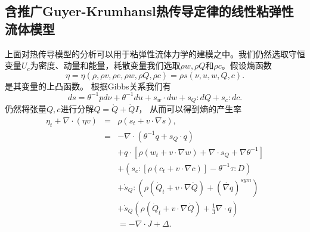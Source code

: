 \subsection{含推广Guyer-Krumhansl热传导定律的线性粘弹性流体模型}
上面对热传导模型的分析可以用于粘弹性流体力学的建模之中。我们仍然选取守恒变量$U_c$为密度、动量和能量，耗散变量我们选取$\rho w, \rho Q$和$ \rho c$。假设熵函数
\begin{equation*}
	\eta = \eta (\rho,\rho v,\rho e,\rho w,\rho Q,\rho c) = \rho s(\nu,u,w,Q,c).
\end{equation*}
是其变量的上凸函数。
根据Gibbs关系我们有
\begin{equation*}
			ds = \theta^{-1} pd\nu + \theta^{-1} du + s_w \cdot dw + s_Q:dQ+ s_c : dc.
\end{equation*}
仍然将张量$Q,c$进行分解$Q = \mathring{Q} +\dot{Q}I$，
从而可以得到熵的产生率
\begin{eqnarray*}
		\eta_t + \nabla \cdot (\eta v) &=& \rho (s_t + v \cdot \nabla s), \\
		&=& -\nabla \cdot (\theta^{-1} q + s_Q \cdot {q} )  \\
		&&+ q \cdot [\rho (w_t + v \cdot \nabla w) + \nabla \cdot s_Q + \nabla \theta^{-1}] \\
		&&+ (s_c:[\rho (c_t + v \cdot \nabla c)] - \theta^{-1} \tau : D) \\
		&&+\mathring{s}_Q:(\rho (\mathring{{Q}}_t + v \cdot \nabla \mathring{Q})+(\mathring{\nabla {q}})^{sym}) \\
		&&+\dot{s}_Q(\rho (\dot{Q}_t + v \cdot \nabla \dot{Q})+\frac{1}{3}\nabla \cdot {q}) \\
		&& = -\nabla \cdot J + \Delta. 
\end{eqnarray*}
